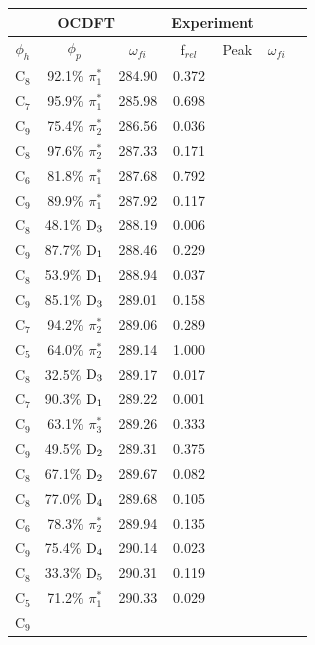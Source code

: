 \documentclass[12pt]{article}
\begin{document}
  \begin{table}
 \centering
     \begin{tabular}{c@{\hskip 0.22in}c@{\hskip 0.22in}c@{\hskip 0.22in}c@{\hskip 0.52in}c@{\hskip 0.22in}c@{\hskip 0.22in}c}
     \hline
     \hline
   \multicolumn{3}{c}{OCDFT} &\multicolumn{2}{c}{Experiment} \\
   \hline
 $\phi_h$ &  $\phi_p$ & $\omega_{fi}$ & f$_{rel}$ & Peak &  $\omega_{fi}$   \\
   \hline
    C$_8$
 &   92.1$\%$ $\pi_1^*$  & 284.90 & 0.372 \\
    C$_7$
 &   95.9$\%$ $\pi_1^*$  & 285.98 & 0.698 \\
    C$_9$
 &   75.4$\%$ $\pi_2^*$  & 286.56 & 0.036 \\
    C$_8$
 &   97.6$\%$ $\pi_2^*$  & 287.33 & 0.171 \\
    C$_6$
 &   81.8$\%$ $\pi_1^*$  & 287.68 & 0.792 \\
    C$_9$
 &   89.9$\%$ $\pi_1^*$  & 287.92 & 0.117 \\
    C$_8$
 &   48.1$\%$ $\rm D_3$  & 288.19 & 0.006 \\
    C$_9$
 &   87.7$\%$ $\rm D_1$  & 288.46 & 0.229 \\
    C$_8$
 &   53.9$\%$ $\rm D_1$  & 288.94 & 0.037 \\
    C$_9$
 &   85.1$\%$ $\rm D_3$  & 289.01 & 0.158 \\
    C$_7$
 &   94.2$\%$ $\pi_2^*$  & 289.06 & 0.289 \\
    C$_5$
 &   64.0$\%$ $\pi_2^*$  & 289.14 & 1.000 \\
    C$_8$
 &   32.5$\%$ $\rm D_3$  & 289.17 & 0.017 \\
    C$_7$
 &   90.3$\%$ $\rm D_1$  & 289.22 & 0.001 \\
    C$_9$
 &   63.1$\%$ $\pi_3^*$  & 289.26 & 0.333 \\
    C$_9$
 &   49.5$\%$ $\rm D_2$  & 289.31 & 0.375 \\
    C$_8$
 &   67.1$\%$ $\rm D_2$  & 289.67 & 0.082 \\
    C$_8$
 &   77.0$\%$ $\rm D_4$  & 289.68 & 0.105 \\
    C$_6$
 &   78.3$\%$ $\pi_2^*$  & 289.94 & 0.135 \\
    C$_9$
 &   75.4$\%$ $\rm D_4$  & 290.14 & 0.023 \\
    C$_8$
 &   33.3$\%$ $\rm D_5$  & 290.31 & 0.119 \\
    C$_5$
 &   71.2$\%$ $\pi_1^*$  & 290.33 & 0.029 \\
    C$_9$

\end{tabular}
\end{table}
\end{document}
